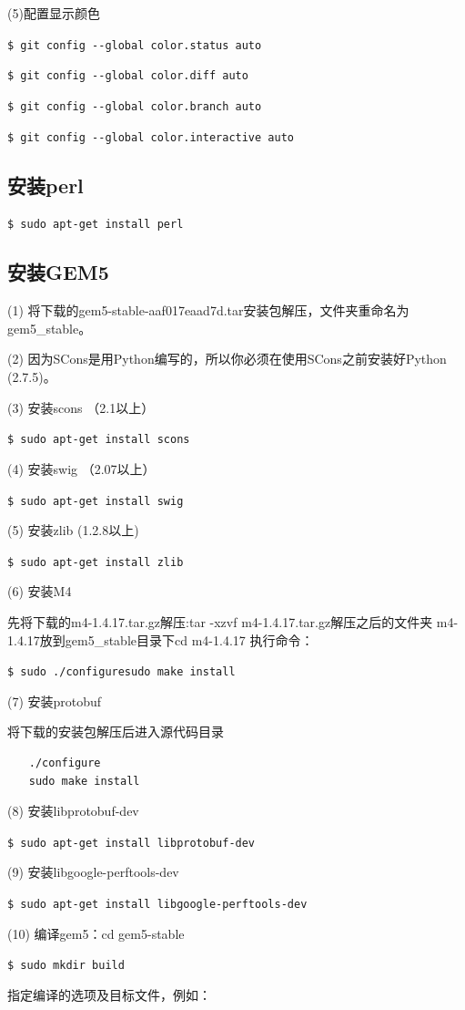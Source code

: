 (5)配置显示颜色

\verb"$ git config --global color.status auto"

\verb"$ git config --global color.diff auto"

\verb"$ git config --global color.branch auto"

\verb"$ git config --global color.interactive auto"

\subsection{安装perl}
\verb"$ sudo apt-get install perl"

\subsection{安装GEM5}
(1) 将下载的gem5-stable-aaf017eaad7d.tar安装包解压，文件夹重命名为gem5\_stable。

(2) 因为SCons是用Python编写的，所以你必须在使用SCons之前安装好Python (2.7.5)。

(3) 安装scons （2.1以上）

\verb"$ sudo apt-get install scons"

(4) 安装swig （2.07以上）

\verb"$ sudo apt-get install swig"

(5) 安装zlib (1.2.8以上)

\verb"$ sudo apt-get install zlib"

(6) 安装M4

先将下载的m4-1.4.17.tar.gz解压:tar -xzvf m4-1.4.17.tar.gz解压之后的文件夹 m4-1.4.17放到gem5\_stable目录下cd m4-1.4.17
执行命令：

\verb"$ sudo ./configuresudo make install"

(7) 安装protobuf

将下载的安装包解压后进入源代码目录
\begin{verbatim}
　　./configure
　　sudo make install
\end{verbatim}

(8) 安装libprotobuf-dev

\verb"$ sudo apt-get install libprotobuf-dev"

(9)	安装libgoogle-perftools-dev

\verb"$ sudo apt-get install libgoogle-perftools-dev"

(10)	编译gem5：cd gem5-stable

\verb"$ sudo mkdir build"

指定编译的选项及目标文件，例如：

